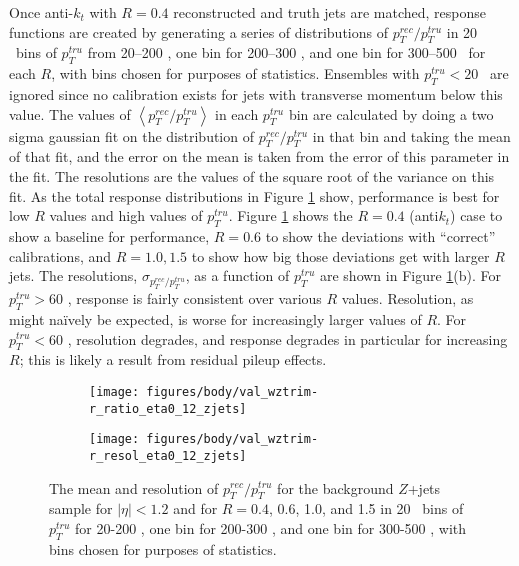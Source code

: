 Once anti-$k_t$ with $R=0.4$ reconstructed and truth jets are matched, response functions are created by generating a series of distributions of $p_T^{rec}/p_T^{tru}$ in 20 \GeV\ bins of $p_T^{tru}$ from 20--200 \GeV, one bin for 200--300 \GeV, and one bin for 300--500 \GeV\ for each $R$, with bins chosen for purposes of statistics.  Ensembles with $p_T^{tru}<20$ \GeV\ are ignored since no calibration exists for jets with transverse momentum below this value.  The values of $\left<p_T^{rec}/p_T^{tru}\right>$ in each $p_T^{tru}$ bin are calculated by doing a two sigma gaussian fit on the distribution of $p_T^{rec}/p_T^{tru}$ in that bin and taking the mean of that fit, and the error on the mean is taken from the error of this parameter in the fit.  The resolutions are the values of the square root of the variance on this fit.  As the total response distributions in Figure \ref{fig:valzjets} show, performance is best for low $R$ values and high values of $p_T^{tru}$.  Figure \ref{fig:valzjets} shows the $R=0.4$ (anti$k_t$) case to show a baseline for performance, $R=0.6$ to show the deviations with ``correct'' calibrations, and $R=1.0,1.5$ to show how big those deviations get with larger $R$ jets.  The resolutions, $\sigma_{p_T^{rec}/p_T^{tru}}$, as a function of $p_T^{tru}$ are shown in Figure \ref{fig:valzjets}(b). For $p_T^{tru}>60$ \GeV, response is fairly consistent over various $R$ values.  Resolution, as might na\"ively be expected, is worse for increasingly larger values of $R$.  For $p_T^{tru}<60$ \GeV, resolution degrades, and response degrades in particular for increasing $R$; this is likely a result from residual pileup effects.

\begin{figure}[!htbp]\captionsetup{justification=centering}
  \begin{center}
\begin{subfigure}[t]{0.49\textwidth}\centering\texttt{[image: figures/body/val\_wztrim-r\_ratio\_eta0\_12\_zjets]}\caption{}\end{subfigure}
\begin{subfigure}[t]{0.49\textwidth}\centering\texttt{[image: figures/body/val\_wztrim-r\_resol\_eta0\_12\_zjets]}\caption{}\end{subfigure}
  \caption{\label{fig:valzjets}The mean and resolution of $p_T^{rec}/p_T^{tru}$  for the background $Z$+jets sample for $\left|\eta\right|<1.2$ and for $R=0.4$, 0.6, 1.0, and 1.5 in 20 \GeV\ bins of $p_T^{tru}$ for 20-200 \GeV, one bin for 200-300 \GeV, and one bin for 300-500 \GeV, with bins chosen for purposes of statistics.}
  \end{center}
\end{figure}
\clearpage

